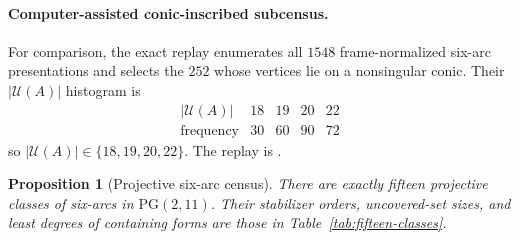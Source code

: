 \documentclass[11pt]{article}
\newtheorem{proposition}[theorem]{Proposition}
\theoremstyle{remark}
\newcommand{\PG}{\mathrm{PG}}
\newcommand{\cU}{\mathcal{U}}
\begin{document}
\paragraph{Computer-assisted conic-inscribed subcensus.}
For comparison, the exact replay enumerates all $1548$ frame-normalized
six-arc presentations and selects the $252$ whose vertices lie on a
nonsingular conic. Their $|\cU(A)|$ histogram is
\[
\begin{array}{c|rrrr}
|\cU(A)|&18&19&20&22\\ \hline
\text{frequency}&30&60&90&72
\end{array}
\]
so
$|\cU(A)|\in\{18,19,20,22\}$. The replay is
.

\begin{proposition}[Projective six-arc census]
\label{prop:fifteen-class-census}
There are exactly fifteen projective classes of six-arcs in \(\PG(2,11)\).
Their stabilizer orders, uncovered-set sizes, and least degrees of containing
forms are those in Table~\ref{tab:fifteen-classes}.
\end{proposition}
\end{document}

